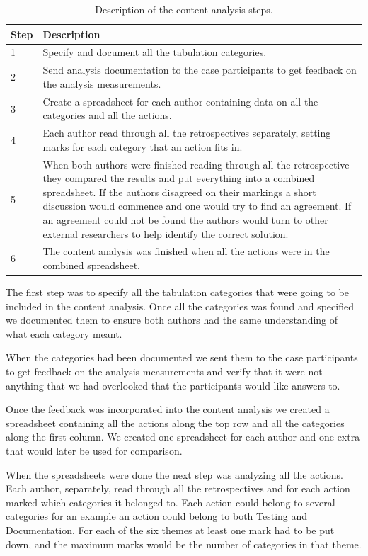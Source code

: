 \begin{table}
	\begin{centering}
		\caption{Description of the content analysis steps.}
		\label{table:content-analysis-steps}
		\begin{tabular}{l p{}}
			Step & Description \\ 
			\hline
			1 & Specify and document all the tabulation categories. \\
			2 & Send analysis documentation to the case participants to get feedback on the analysis measurements. \\
			3 & Create a spreadsheet for each author containing data on all the categories and all the actions. \\
			4 & Each author read through all the retrospectives separately, setting marks for each category that an action fits in. \\
			5 & When both authors were finished reading through all the retrospective they compared the results and put everything into a combined spreadsheet. If the authors disagreed on their markings a short discussion would commence and one would try to find an agreement. If an agreement could not be found the authors would turn to other external researchers to help identify the correct solution. \\
			6 & The content analysis was finished when all the actions were in the combined spreadsheet. \\
		\end{tabular}
	\end{centering}
\end{table}

The first step was to specify all the tabulation categories that were going to be included in the content analysis. Once all the categories was found and specified we documented them to ensure both authors had the same understanding of what each category meant. 

When the categories had been documented we sent them to the case participants to get feedback on the analysis measurements and verify that it were not anything that we had overlooked that the participants would like answers to. 

Once the feedback was incorporated into the content analysis we created a spreadsheet containing all the actions along the top row and all the categories along the first column. We created one spreadsheet for each author and one extra that would later be used for comparison. 

When the spreadsheets were done the next step was analyzing all the actions. Each author, separately, read through all the retrospectives and for each action marked which categories it belonged to. Each action could belong to several categories for an example an action could belong to both Testing and Documentation. For each of the six themes at least one mark had to be put down, and the maximum marks would be the number of categories in that theme. 

